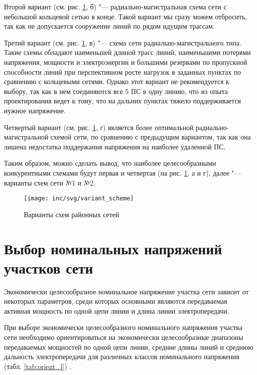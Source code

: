 Второй вариант (см. рис. \ref{fig:variant_scheme}, б) "--- радиально-магистральная схема сети с небольшой кольцевой сетью в конце. Такой вариант мы сразу можем отбросить, так как не допускается сооружение линий по рядом идущим трассам.

Третий вариант (см. рис. \ref{fig:variant_scheme}, в) "--- схема сети радиально-магистрального типа. Такие схемы обладают наименьшей длиной трасс линий, наименьшими потерями напряжения, мощности и электроэнергии и большими резервами по пропускной способности линий при перспективном росте нагрузок в заданных пунктах по сравнению с кольцевыми сетями. Однако этот вариант не рекомендуется к выбору, так как в нем соединяются все 5 ПС в одну линию, что из опыта проектирования ведет к тому, что на дальних пунктах тяжело поддерживается нужное напряжение.

Четвертый вариант (см. рис. \ref{fig:variant_scheme}, г) является более оптимальной радиально-магистральной схемой сети, по сравнению с предыдущим вариантом, так как она лишена недостатка поддержания напряжения на наиболее удаленной ПС.

Таким образом, можно сделать вывод, что наиболее целесообразными конкурентными схемами будут первая и четвертая (на рис. \ref{fig:variant_scheme}, а и г), далее "--- варианты схем сети №1 и №2.

\begin{figure}[h]
	\centering
	\texttt{[image: inc/svg/variant\_scheme]}
	\caption{Варианты схем районных сетей}
	\label{fig:variant_scheme}
\end{figure}


\section{Выбор номинальных напряжений участков сети}

Экономически целесообразное номинальное напряжение участка сети зависит от некоторых параметров, среди которых основными являются передаваемая активная мощность по одной цепи линии и длина линии электропередачи.

При выборе экономически целесообразного номинального напряжения участка сети необходимо ориентироваться на экономически целесообразные диапазоны передаваемых мощностей по одной цепи линии, средние длины линий и среднюю дальность электропередачи для различных классов номинального напряжения (табл. \ref{tab:orient_l}) \cite{глазунов_шведов}.

